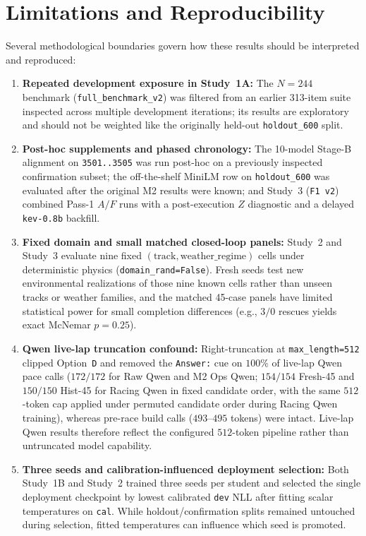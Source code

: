 \documentclass[11pt,a4paper]{article}
\begin{document}
\section{Limitations and Reproducibility}

Several methodological boundaries govern how these results should be interpreted and reproduced:
\begin{enumerate}[leftmargin=1.5em,itemsep=2pt]
  \item \textbf{Repeated development exposure in Study~1A:} The $N=244$ benchmark (\texttt{full\_benchmark\_v2}) was filtered from an earlier 313-item suite inspected across multiple development iterations; its results are exploratory and should not be weighted like the originally held-out \texttt{holdout\_600} split.
  \item \textbf{Post-hoc supplements and phased chronology:} The 10-model Stage-B alignment on \texttt{3501..3505} was run post-hoc on a previously inspected confirmation subset; the off-the-shelf MiniLM row on \texttt{holdout\_600} was evaluated after the original M2 results were known; and Study~3 (\texttt{F1 v2}) combined Pass-1 $A/F$ runs with a post-execution $Z$ diagnostic and a delayed \texttt{kev-0.8b} backfill.
  \item \textbf{Fixed domain and small matched closed-loop panels:} Study~2 and Study~3 evaluate nine fixed $(\text{track}, \text{weather\_regime})$ cells under deterministic physics (\texttt{domain\_rand=False}). Fresh seeds test new environmental realizations of those nine known cells rather than unseen tracks or weather families, and the matched 45-case panels have limited statistical power for small completion differences (e.g., $3/0$ rescues yields exact McNemar $p = 0.25$).
  \item \textbf{Qwen live-lap truncation confound:} Right-truncation at \texttt{max\_length=512} clipped Option~\texttt{D} and removed the \texttt{Answer:} cue on $100\%$ of live-lap Qwen pace calls ($172/172$ for Raw Qwen and M2 Ops Qwen; $154/154$ Fresh-45 and $150/150$ Hist-45 for Racing Qwen in fixed candidate order, with the same $512$-token cap applied under permuted candidate order during Racing Qwen training), whereas pre-race build calls ($493$--$495$ tokens) were intact. Live-lap Qwen results therefore reflect the configured $512$-token pipeline rather than untruncated model capability.
  \item \textbf{Three seeds and calibration-influenced deployment selection:} Both Study~1B and Study~2 trained three seeds per student and selected the single deployment checkpoint by lowest calibrated \texttt{dev} NLL after fitting scalar temperatures on \texttt{cal}. While holdout/confirmation splits remained untouched during selection, fitted temperatures can influence which seed is promoted.

\end{enumerate}
\end{document}
